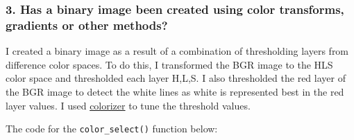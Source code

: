 \documentclass[11pt]{article}
\begin{document}
    \hypertarget{has-a-binary-image-been-created-using-color-transforms-gradients-or-other-methods}{%
\subsubsection{3. Has a binary image been created using color
transforms, gradients or other
methods?}\label{has-a-binary-image-been-created-using-color-transforms-gradients-or-other-methods}}

I created a binary image as a result of a combination of thresholding
layers from difference color spaces. To do this, I transformed the BGR
image to the HLS color space and thresholded each layer H,L,S. I also
thresholded the red layer of the BGR image to detect the white lines as
white is represented best in the red layer values. I used
\href{http://colorizer.org/}{colorizer} to tune the threshold values.

The code for the \texttt{color\_select()} function below:
\end{document}
